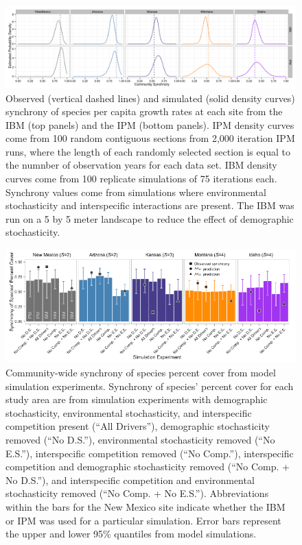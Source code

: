 \documentclass[12pt,]{article}
\begin{document}
\begin{figure}[!ht]
  \centering
      \includegraphics[width=6in]{./components/figureS1.png}
  \caption{Observed (vertical dashed lines) and simulated (solid density curves) synchrony of species per capita growth rates at each site from the IBM (top panels) and the IPM (bottom panels). IPM density curves come from 100 random contiguous sections from 2,000 iteration IPM runs, where the length of each randomly selected section is equal to the numnber of observation years for each data set. IBM density curves come from 100 replicate simulations of 75 iterations each. Synchrony values come from simulations where environmental stochasticity and interspecific interactions are present. The IBM was run on a 5 by 5 meter landscape to reduce the effect of demographic stochasticity.}
\end{figure}

\pagebreak{}

\begin{figure}[!ht]
  \centering
      \includegraphics[width=6in]{./components/formatted_figures/formatted_figureS2.png}
  \caption{Community-wide synchrony of species percent cover from model simulation experiments. Synchrony of species' percent cover for each study area are from simulation experiments with demographic stochasticity, environmental stochasticity, and interspecific competition present (``All Drivers''), demographic stochasticity removed (``No D.S.''), environmental stochasticity removed (``No E.S.''), interspecific competition removed (``No Comp.''), interspecific competition and demographic stochasticity removed (``No Comp. + No D.S.''), and interspecific competition and environmental stochasticity removed (``No Comp. + No E.S.''). Abbreviations within the bars for the New Mexico site indicate whether the IBM or IPM was used for a particular simulation. Error bars represent the upper and lower 95\% quantiles from model simulations.}
\end{figure}
\end{document}
